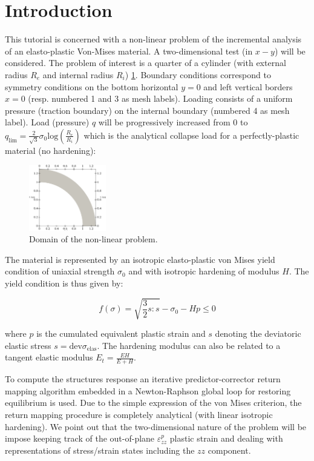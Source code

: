 \newcommand{\psd}[1]{{\small\sffamily{\color{blue!60}#1}}}

\section{Introduction}

This tutorial is concerned with a non-linear problem of the incremental
analysis of an elasto-plastic Von-Mises material. A two-dimensional test
(in \(x-y\)) will be considered. The problem of interest is a quarter of
a cylinder (with external radius \(R_e\) and internal radius \(R_i\))
\cref{bar-sd}. Boundary conditions correspond to symmetry conditions on
the bottom horizontal \(y=0\) and left vertical borders \(x=0\) (resp.
numbered 1 and 3 as mesh labels). Loading consists of a uniform pressure
(traction boundary) on the internal boundary (numbered 4 as mesh label).
Load (pressure) \(q\) will be progressively increased from 0 to
\(q_{\text{lim}}=\frac{2}{\sqrt3}\sigma_0\text{log}(\frac{R_e}{R_i})\)
which is the analytical collapse load for a perfectly-plastic material
(no hardening):

\begin{figure}[h!]
\centering
\includegraphics[width=0.3\textwidth]{./Images/nl-arc.png}
\caption{Domain of the non-linear problem. \label{bar-sd}}
\end{figure}

The material is represented by an isotropic elasto-plastic von Mises
yield condition of uniaxial strength \(\sigma_0\) and with isotropic
hardening of modulus \(H\). The yield condition is thus given by:

\[f(\sigma)=\sqrt{\frac{3}{2}s:s}-\sigma_0-Hp\le0\]

where \(p\) is the cumulated equivalent plastic strain and \(s\)
denoting the deviatoric elastic stress
\(s = \text{dev} \sigma_{\text{elas}}\). The hardening modulus can also
be related to a tangent elastic modulus \(E_t=\frac{EH}{E+H}\).

To compute the structures response an iterative predictor-corrector
return mapping algorithm embedded in a Newton-Raphson global loop for
restoring equilibrium is used. Due to the simple expression of the von
Mises criterion, the return mapping procedure is completely analytical
(with linear isotropic hardening). We point out that the two-dimensional
nature of the problem will be impose keeping track of the out-of-plane
\(\varepsilon^p_{zz}\) plastic strain and dealing with representations
of stress/strain states including the \(zz\) component.

